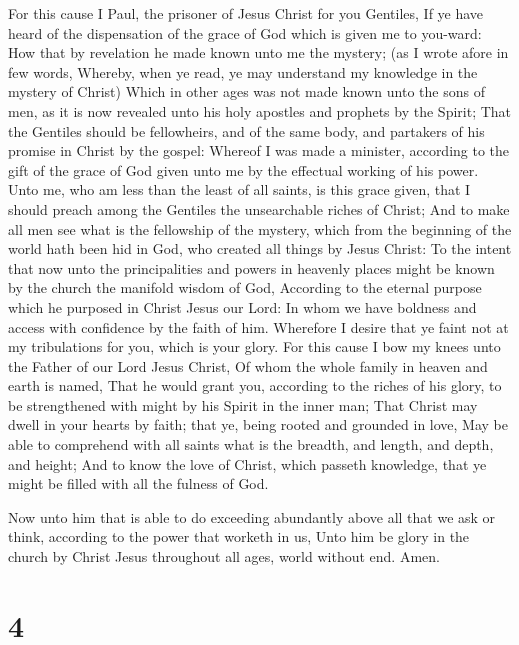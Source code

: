  For this cause I Paul, the prisoner of Jesus Christ for
you Gentiles,  If ye have heard of the dispensation of the
grace of God which is given me to you-ward:  How that by
revelation he made known unto me the mystery; (as I wrote afore in few
words,  Whereby, when ye read, ye may understand my
knowledge in the mystery of Christ)  Which in other ages
was not made known unto the sons of men, as it is now revealed unto his
holy apostles and prophets by the Spirit;  That the
Gentiles should be fellowheirs, and of the same body, and partakers of
his promise in Christ by the gospel:  Whereof I was made a
minister, according to the gift of the grace of God given unto me by the
effectual working of his power.  Unto me, who am less than
the least of all saints, is this grace given, that I should preach among
the Gentiles the unsearchable riches of Christ;  And to
make all men see what is the fellowship of the mystery, which from the
beginning of the world hath been hid in God, who created all things by
Jesus Christ:  To the intent that now unto the
principalities and powers in heavenly places might be known by the
church the manifold wisdom of God,  According to the
eternal purpose which he purposed in Christ Jesus our Lord:
 In whom we have boldness and access with confidence by
the faith of him.  Wherefore I desire that ye faint not
at my tribulations for you, which is your glory.  For
this cause I bow my knees unto the Father of our Lord Jesus Christ,
 Of whom the whole family in heaven and earth is named,
 That he would grant you, according to the riches of his
glory, to be strengthened with might by his Spirit in the inner man;
 That Christ may dwell in your hearts by faith; that ye,
being rooted and grounded in love,  May be able to
comprehend with all saints what is the breadth, and length, and depth,
and height;  And to know the love of Christ, which
passeth knowledge, that ye might be filled with all the fulness of God.

 Now unto him that is able to do exceeding abundantly
above all that we ask or think, according to the power that worketh in
us,  Unto him be glory in the church by Christ Jesus
throughout all ages, world without end. Amen.

\hypertarget{section-3}{%
\section{4}\label{section-3}}

